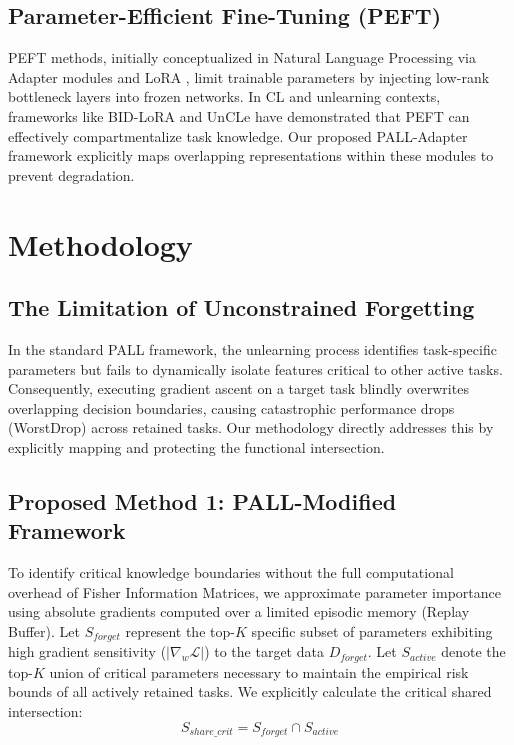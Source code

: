 \documentclass[conference]{IEEEtran}
\theoremstyle{plain}
\theoremstyle{definition}
\theoremstyle{remark}
\begin{document}
\subsection{Parameter-Efficient Fine-Tuning (PEFT)}
PEFT methods, initially conceptualized in Natural Language Processing via Adapter modules \cite{houlsby2019parameter} and LoRA \cite{hu2021lora}, limit trainable parameters by injecting low-rank bottleneck layers into frozen networks. In CL and unlearning contexts, frameworks like BID-LoRA \cite{rachapudi2026bidlora} and UnCLe \cite{adhikari2026uncle} have demonstrated that PEFT can effectively compartmentalize task knowledge. Our proposed PALL-Adapter framework explicitly maps overlapping representations within these modules to prevent degradation.

\section{Methodology}

\subsection{The Limitation of Unconstrained Forgetting}
In the standard PALL framework, the unlearning process identifies task-specific parameters but fails to dynamically isolate features critical to other active tasks. Consequently, executing gradient ascent on a target task blindly overwrites overlapping decision boundaries, causing catastrophic performance drops (WorstDrop) across retained tasks. Our methodology directly addresses this by explicitly mapping and protecting the functional intersection.

\subsection{Proposed Method 1: PALL-Modified Framework}
To identify critical knowledge boundaries without the full computational overhead of Fisher Information Matrices, we approximate parameter importance using absolute gradients computed over a limited episodic memory (Replay Buffer). Let \(S_{forget}\) represent the top-\(K\) specific subset of parameters exhibiting high gradient sensitivity (\(|\nabla_w \mathcal{L}|\)) to the target data \(D_{forget}\). Let \(S_{active}\) denote the top-\(K\) union of critical parameters necessary to maintain the empirical risk bounds of all actively retained tasks. We explicitly calculate the critical shared intersection:
\begin{equation}
S_{share\_crit} = S_{forget} \cap S_{active}
\end{equation}
\end{document}
